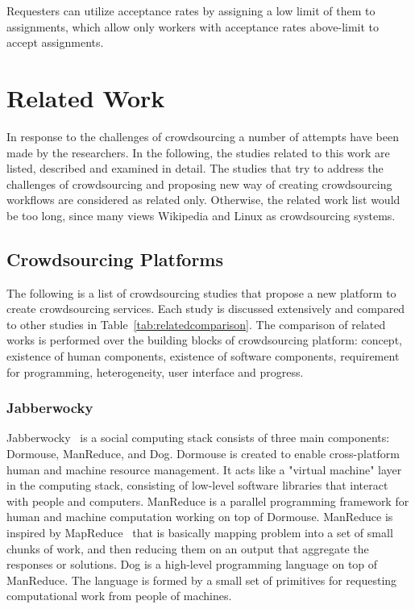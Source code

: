 Requesters can utilize acceptance rates by assigning a low limit of them to 
assignments, which allow only workers with acceptance rates above-limit 
to accept assignments.



\section{Related Work}
In response to the challenges of crowdsourcing a number of attempts have been made 
by the researchers. In the following, the studies related to this work are listed, 
described and examined in detail. The studies that try to address the challenges of 
crowdsourcing and proposing new way of creating crowdsourcing workflows are
considered as related only. Otherwise, the related work list would be too long, 
since many views Wikipedia and Linux as crowdsourcing systems.



\subsection{Crowdsourcing Platforms}
The following is a list of crowdsourcing studies that propose a new platform 
to create crowdsourcing services. Each study is discussed extensively 
and compared to other studies in Table~\ref{tab:relatedcomparison}. 
The comparison of related works is performed over the building blocks of 
crowdsourcing platform: 
concept, existence of human components, existence of software components, 
requirement for programming, heterogeneity, user interface and progress.

\subsubsection{Jabberwocky}
Jabberwocky~\cite{Ahmad2011} is a social computing stack consists of three 
main components: Dormouse, ManReduce, and Dog. Dormouse is created to 
enable cross-platform human and machine resource management. It acts like a 
"virtual machine" layer in the computing stack, consisting of low-level software 
libraries that interact with people and computers. ManReduce is a parallel 
programming framework for human and machine computation working on top 
of Dormouse. ManReduce is inspired by MapReduce~\cite{Dean2008} that is 
basically mapping problem into a set of small chunks of work, and then reducing 
them on an output that aggregate the responses or solutions. Dog is a high-level 
programming language on top of ManReduce. The language is formed by a small 
set of primitives for requesting computational work from people of machines. 

